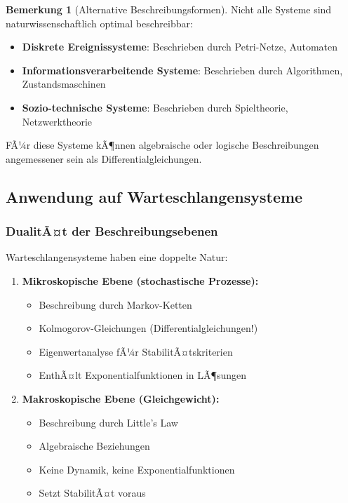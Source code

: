 ﻿\documentclass[a4paper,12pt]{scrreprt}
\theoremstyle{definition}
\newtheorem{bemerkung}{Bemerkung}[section]
\begin{document}
\begin{bemerkung}[Alternative Beschreibungsformen]
	Nicht alle Systeme sind naturwissenschaftlich optimal beschreibbar:
	\begin{itemize}
		\item[-] \textbf{Diskrete Ereignissysteme}: Beschrieben durch Petri-Netze, Automaten
		\item[-] \textbf{Informationsverarbeitende Systeme}: Beschrieben durch Algorithmen, Zustandsmaschinen
		\item[-] \textbf{Sozio-technische Systeme}: Beschrieben durch Spieltheorie, Netzwerktheorie
	\end{itemize}
	
	FÃ¼r diese Systeme kÃ¶nnen algebraische oder logische Beschreibungen angemessener sein als Differentialgleichungen.
\end{bemerkung}

\subsection{Anwendung auf Warteschlangensysteme}

\subsubsection{DualitÃ¤t der Beschreibungsebenen}

Warteschlangensysteme haben eine doppelte Natur:

\begin{enumerate}
	\item[-] \textbf{Mikroskopische Ebene (stochastische Prozesse):}
	\begin{itemize}
		\item[-] Beschreibung durch Markov-Ketten
		\item[-] Kolmogorov-Gleichungen (Differentialgleichungen!)
		\item[-] Eigenwertanalyse fÃ¼r StabilitÃ¤tskriterien
		\item[-] EnthÃ¤lt Exponentialfunktionen in LÃ¶sungen
	\end{itemize}
	
	\item[-] \textbf{Makroskopische Ebene (Gleichgewicht):}
	\begin{itemize}
		\item[-] Beschreibung durch Little's Law
		\item[-] Algebraische Beziehungen
		\item[-] Keine Dynamik, keine Exponentialfunktionen
		\item[-] Setzt StabilitÃ¤t voraus
	\end{itemize}
\end{enumerate}
\end{document}
